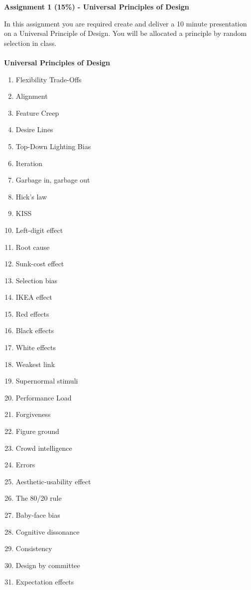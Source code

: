 
	
\begin{flushleft}
\Large\textbf{Assignment 1 (15\%) - Universal Principles of Design}\\
\end{flushleft}

In this assignment you are required create and deliver a 10 minute presentation on a Universal Principle of Design.  You will be allocated a principle by random selection in class.\\
\\
\textbf{Universal Principles of Design}
\begin{enumerate}
	\item Flexibility Trade-Offs
	\item Alignment
	\item Feature Creep
	\item Desire Lines
	\item Top-Down Lighting Bias
	\item Iteration
	\item Garbage in, garbage out
	\item Hick’s law
	\item KISS
	\item Left-digit effect
	\item Root cause
	\item Sunk-cost effect
	\item Selection bias
	\item IKEA effect
	\item Red effects
	\item Black effects
	\item White effects
	\item Weakest link
	\item Supernormal stimuli
	\item Performance Load
	\item Forgiveness
	\item Figure ground
	\item Crowd intelligence
	\item Errors
	\item Aesthetic-usability effect
	\item The 80/20 rule
	\item Baby-face bias
	\item Cognitive dissonance
	\item Consistency
	\item Design by committee
	\item Expectation effects

\end{enumerate}
